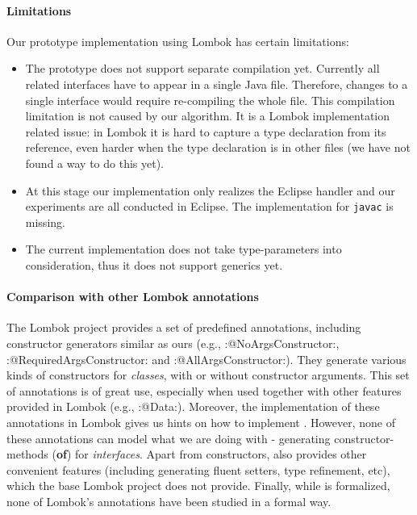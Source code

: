 \paragraph{Limitations}
Our prototype implementation using Lombok has certain limitations:
\begin{itemize}
\item The prototype does not support separate compilation yet. Currently all
  related interfaces have to appear in a single Java file. Therefore, changes to
  a single interface would require re-compiling the whole file. This compilation
  limitation is not caused by our algorithm. It is a Lombok implementation related
  issue: in Lombok it is hard to capture a type declaration from its reference,
  even harder when the type declaration is in other files (we have not found a
  way to do this yet).
\item At this stage our implementation only realizes the Eclipse handler and our
  experiments are all conducted in Eclipse. The implementation for
  \texttt{javac} is missing.
\item The current implementation does not take type-parameters into
  consideration, thus it does not support generics yet.
\end{itemize}

\paragraph{Comparison with other Lombok annotations}
The Lombok project provides a set of predefined annotations, including constructor
generators similar as ours (e.g., \Q:@NoArgsConstructor:,
\Q:@RequiredArgsConstructor: and \Q:@AllArgsConstructor:). They
generate various kinds of constructors for \emph{classes}, with or without
constructor arguments. This set of annotations is of great use, especially when
used together with other features provided in Lombok (e.g.,
\Q:@Data:). Moreover, the implementation of these annotations in Lombok
gives us hints on how to implement \mixin. However, none of these annotations
can model what we are doing with \mixin - generating constructor-methods
(\textbf{of}) for \emph{interfaces}. Apart from constructors, \mixin also
provides other convenient features (including generating fluent setters, type
refinement, etc), which the base Lombok project does not provide.
Finally, while \mixin is formalized, none of Lombok's annotations have been
studied in a formal way.


